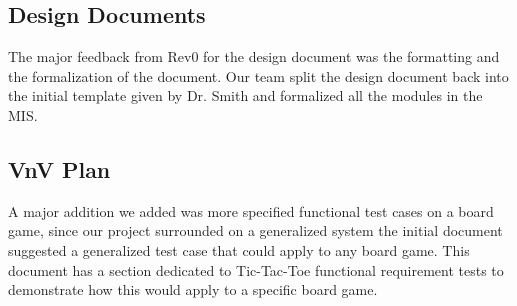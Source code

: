 \documentclass{article}
\begin{document}
\subsection{Design Documents}
The major feedback from Rev0 for the design document was the formatting and the formalization of the document. Our team split the design document back into the initial template given by Dr. Smith and formalized all the modules in the MIS.
\subsection{VnV Plan}
A major addition we added was more specified functional test cases on a board game, since our project surrounded on a generalized system the initial document suggested a generalized test case that could apply to any board game. This document has a section dedicated to Tic-Tac-Toe functional requirement tests to demonstrate how this would apply to a specific board game.
\end{document}
